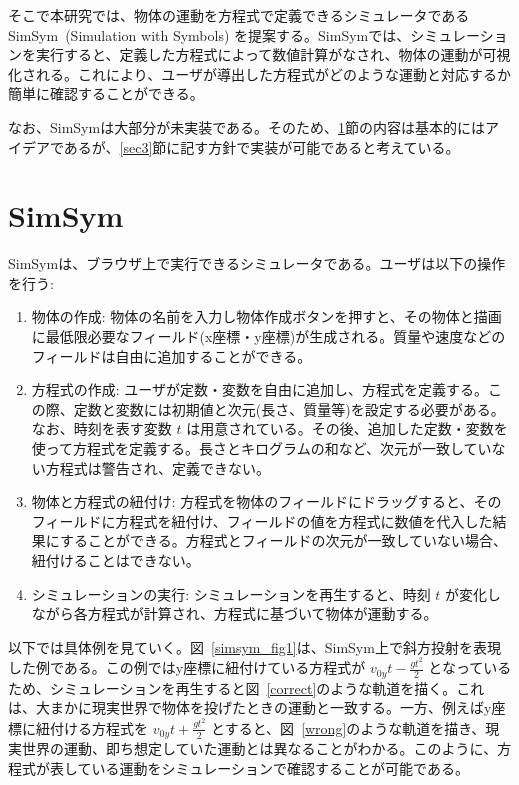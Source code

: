 \documentclass[11pt, a4paper, oneside, twocolumn, dvipdfmx]{jsarticle}
\newcommand{\simname}{SimSym}
\newcommand{\simnamealt}{Simulation with Symbols}
\begin{document}
そこで本研究では、物体の運動を方程式で定義できるシミュレータである \simname~(\simnamealt) を提案する。\simname では、シミュレーションを実行すると、定義した方程式によって数値計算がなされ、物体の運動が可視化される。これにより、ユーザが導出した方程式がどのような運動と対応するか簡単に確認することができる。

なお、\simname は大部分が未実装である。そのため、\ref{sec2}節の内容は基本的にはアイデアであるが、\ref{sec3}節に記す方針で実装が可能であると考えている。

\section{\simname} \label{sec2}

\simname は、ブラウザ上で実行できるシミュレータである。ユーザは以下の操作を行う:

\begin{enumerate}
\item 物体の作成: 物体の名前を入力し物体作成ボタンを押すと、その物体と描画に最低限必要なフィールド(x座標・y座標)が生成される。質量や速度などのフィールドは自由に追加することができる。
\item 方程式の作成: ユーザが定数・変数を自由に追加し、方程式を定義する。この際、定数と変数には初期値と次元(長さ、質量等)を設定する必要がある。なお、時刻を表す変数 $t$ は用意されている。その後、追加した定数・変数を使って方程式を定義する。長さとキログラムの和など、次元が一致していない方程式は警告され、定義できない。
\item 物体と方程式の紐付け: 方程式を物体のフィールドにドラッグすると、そのフィールドに方程式を紐付け、フィールドの値を方程式に数値を代入した結果にすることができる。方程式とフィールドの次元が一致していない場合、紐付けることはできない。
\item シミュレーションの実行: シミュレーションを再生すると、時刻 $t$ が変化しながら各方程式が計算され、方程式に基づいて物体が運動する。
\end{enumerate}

以下では具体例を見ていく。図~\ref{simsym_fig1}は、\simname 上で斜方投射を表現した例である。この例ではy座標に紐付けている方程式が $v_{0y}t - \frac{gt^2}{2}$ となっているため、シミュレーションを再生すると図~\ref{correct}のような軌道を描く。これは、大まかに現実世界で物体を投げたときの運動と一致する。一方、例えばy座標に紐付ける方程式を $v_{0y}t + \frac{gt^2}{2}$ とすると、図~\ref{wrong}のような軌道を描き、現実世界の運動、即ち想定していた運動とは異なることがわかる。このように、方程式が表している運動をシミュレーションで確認することが可能である。
\end{document}
